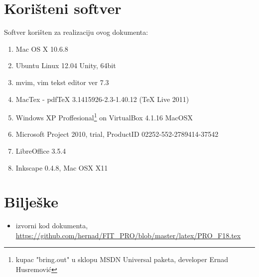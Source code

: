 \documentclass[times, utf8, seminar]{fit}
\begin{document}
\appendix

\chapter{Korišteni softver}
Softver korišten za realizaciju ovog dokumenta:
\begin{enumerate}
  \item Mac OS X 10.6.8
  \item Ubuntu Linux 12.04 Unity, 64bit
  \item mvim, vim tekst editor ver 7.3
  \item MacTex - pdfTeX 3.1415926-2.3-1.40.12 (TeX Live 2011)
  \item Windows XP Proffesional\footnote{kupac "bring.out" u sklopu MSDN Universal paketa, developer Ernad Husremović} on VirtualBox 4.1.16 MacOSX 
  \item Microsoft Project 2010, trial, ProductID 02252-552-2789414-37542
  \item LibreOffice 3.5.4
  \item Inkscape 0.4.8, Mac OSX X11
\end{enumerate}


\chapter{Bilješke}
\label{chap:biljeske}

\begin{itemize}
  \item izvorni kod dokumenta, \url{https://github.com/hernad/FIT_PRO/blob/master/latex/PRO_F18.tex}
\end{itemize}
\end{document}
